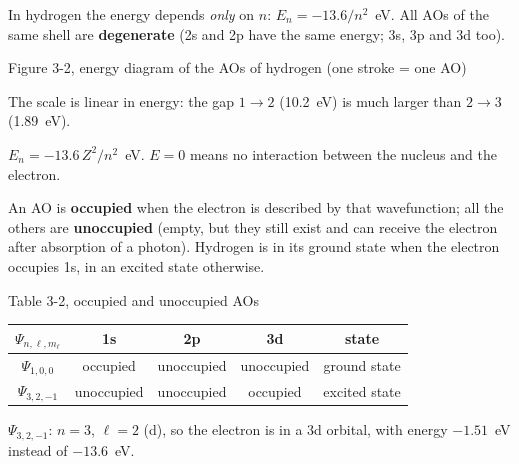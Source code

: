 In hydrogen the energy depends \emph{only} on $n$: $E_n = -13.6/n^2$~eV. All AOs of the same shell are
\textbf{degenerate} (2s and 2p have the same energy; 3s, 3p and 3d too).
\begin{handout}{Figure 3-2, energy diagram of the AOs of hydrogen (one stroke = one AO)}
\begin{center}
\end{center}
\small The scale is linear in energy: the gap $1\to2$ (10.2~eV) is much larger than $2\to3$ (1.89~eV).
\end{handout}
\begin{concept}
$E_n = -13.6\,Z^2/n^2$~eV. $E = 0$ means no interaction between the nucleus and the electron.
\end{concept}

An AO is \textbf{occupied} when the electron is described by that wavefunction; all the others are
\textbf{unoccupied} (empty, but they still exist and can receive the electron after absorption of a
photon). Hydrogen is in its ground state when the electron occupies 1s, in an excited state otherwise.
\begin{handout}{Table 3-2, occupied and unoccupied AOs}
\begin{center}\small
\begin{tabular}{|c|c|c|c|c|}
\hline
$\Psi_{n,\ell,m_\ell}$ & 1s & 2p & 3d & state\\ \hline
$\Psi_{1,0,0}$ & occupied & unoccupied & unoccupied & ground state\\ \hline
$\Psi_{3,2,-1}$ & unoccupied & unoccupied & occupied & excited state\\ \hline
\end{tabular}
\end{center}
$\Psi_{3,2,-1}$: $n = 3$, $\ell = 2$ (d), so the electron is in a 3d orbital, with energy
$-1.51$~eV instead of $-13.6$~eV.
\end{handout}

